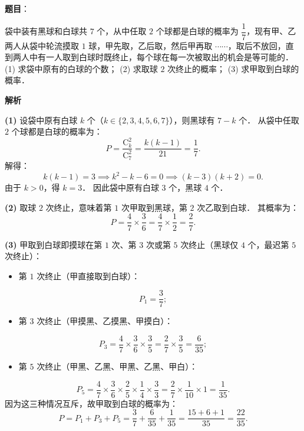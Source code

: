 \begin{answer}

\end{answer}
\begin{answer}

\textbf{题目}：

袋中装有黑球和白球共 $7$ 个，从中任取 $2$ 个球都是白球的概率为 $\dfrac{1}{7}$，现有甲、乙两人从袋中轮流摸取 $1$ 球，甲先取，乙后取，然后甲再取 $\cdots\cdots$，取后不放回，直到两人中有一人取到白球时既终止，每个球在每一次被取出的机会是等可能的．
(1) 求袋中原有的白球的个数；
(2) 求取球 $2$ 次终止的概率；
(3) 求甲取到白球的概率．

\textbf{解析}

\textbf{(1)}
设袋中原有白球 $k$ 个（$k \in \{2, 3, 4, 5, 6, 7\}$），则黑球有 $7 - k$ 个．
从袋中任取 $2$ 个球都是白球的概率为：
\nopagebreak[4]
\[
P = \dfrac{\mathrm{C}_k^2}{\mathrm{C}_7^2} = \dfrac{k(k-1)}{21} = \dfrac{1}{7}.
\]
解得：
\nopagebreak[4]
\[
k(k-1) = 3 \implies k^2 - k - 6 = 0 \implies (k - 3)(k + 2) = 0.
\]
由于 $k > 0$，得 $k = 3$．
因此袋中原有白球 $3$ 个，黑球 $4$ 个．

\textbf{(2)}
取球 $2$ 次终止，意味着第 $1$ 次甲取到黑球，第 $2$ 次乙取到白球．
其概率为：
\nopagebreak[4]
\[
P = \dfrac{4}{7} \times \dfrac{3}{6} = \dfrac{4}{7} \times \dfrac{1}{2} = \dfrac{2}{7}.
\]

\textbf{(3)}
甲取到白球即摸球在第 $1$ 次、第 $3$ 次或第 $5$ 次终止（黑球仅 $4$ 个，最迟第 $5$ 次终止）：
\begin{itemize}
\item 第 $1$ 次终止（甲直接取到白球）：
\end{itemize}
\nopagebreak[4]
\[
P_1 = \dfrac{3}{7};
\]
\begin{itemize}
\item 第 $3$ 次终止（甲摸黑、乙摸黑、甲摸白）：
\end{itemize}
\nopagebreak[4]
\[
P_3 = \dfrac{4}{7} \times \dfrac{3}{6} \times \dfrac{3}{5} = \dfrac{2}{7} \times \dfrac{3}{5} = \dfrac{6}{35};
\]
\begin{itemize}
\item 第 $5$ 次终止（甲黑、乙黑、甲黑、乙黑、甲白）：
\end{itemize}
\nopagebreak[4]
\[
P_5 = \dfrac{4}{7} \times \dfrac{3}{6} \times \dfrac{2}{5} \times \dfrac{1}{4} \times \dfrac{3}{3} = \dfrac{2}{7} \times \dfrac{1}{10} \times 1 = \dfrac{1}{35}.
\]
因为这三种情况互斥，故甲取到白球的概率为：
\nopagebreak[4]
\[
P = P_1 + P_3 + P_5 = \dfrac{3}{7} + \dfrac{6}{35} + \dfrac{1}{35} = \dfrac{15 + 6 + 1}{35} = \dfrac{22}{35}.
\]




\end{answer}
